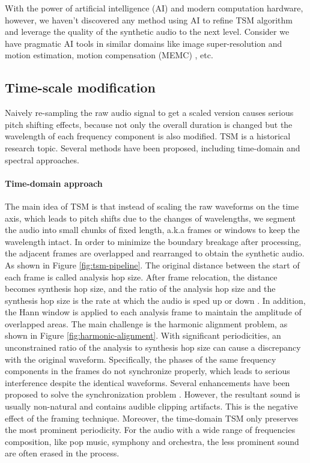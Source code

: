 \documentclass[12pt]{article}
\begin{document}
With the power of artificial intelligence (AI) and modern computation hardware, however, we haven't discovered any method using AI to refine TSM algorithm and leverage the quality of the synthetic audio to the next level. Consider we have pragmatic AI tools in similar domains like image super-resolution \cite{led17} and motion estimation, motion compensation (MEMC) \cite{bao21}, etc.

\subsection{Time-scale modification}
Naively re-sampling the raw audio signal to get a scaled version causes serious pitch shifting effects, because not only the overall duration is changed but the wavelength of each frequency component is also modified. TSM is a historical research topic. Several methods have been proposed, including time-domain and spectral approaches.

\paragraph{Time-domain approach}
The main idea of TSM is that instead of scaling the raw waveforms on the time axis, which leads to pitch shifts due to the changes of wavelengths, we segment the audio into small chunks of fixed length, a.k.a frames or windows to keep the wavelength intact. In order to minimize the boundary breakage after processing, the adjacent frames are overlapped and rearranged to obtain the synthetic audio. As shown in Figure \ref{fig:tsm-pipeline}. The original distance between the start of each frame is called analysis hop size. After frame relocation, the distance becomes synthesis hop size, and the ratio of the analysis hop size and the synthesis hop size is the rate at which the audio is sped up or down \cite{dri16}. In addition, the Hann window \cite{ess86} is applied to each analysis frame to maintain the amplitude of overlapped areas. The main challenge is the harmonic alignment problem, as shown in Figure \ref{fig:harmonic-alignment}. With significant periodicities, an unconstrained ratio of the analysis to synthesis hop size can cause a discrepancy with the original waveform. Specifically, the phases of the same frequency components in the frames do not synchronize properly, which leads to serious interference despite the identical waveforms. Several enhancements have been proposed to solve the synchronization problem \cite{hej91}\cite{eri90}\cite{ver93}. However, the resultant sound is usually non-natural and contains audible clipping artifacts. This is the negative effect of the framing technique. Moreover, the time-domain TSM only preserves the most prominent periodicity. For the audio with a wide range of frequencies composition, like pop music, symphony and orchestra, the less prominent sound are often erased in the process.
\end{document}
